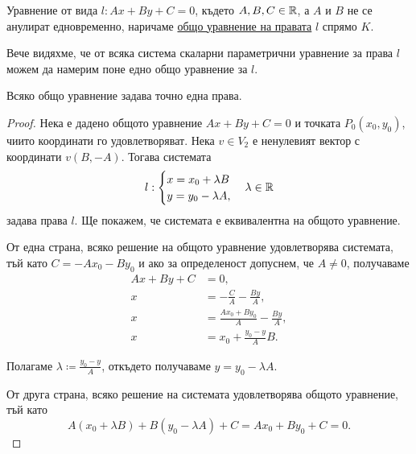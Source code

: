 \documentclass[numbers=endperiod, DIV=15]{scrartcl}
\begin{document}
\begin{definition}
  Уравнение от вида $l: Ax + By + C = 0$, където $A, B, C \in \mathbb{R}$, а $A$ и $B$ не се анулират едновременно, наричаме \underline{общо уравнение на правата} $l$ спрямо $K$.
\end{definition}

Вече видяхме, че от всяка система скаларни параметрични уравнение за права $l$ можем да намерим поне едно общо уравнение за $l$.

\begin{proposition}
  Всяко общо уравнение задава точно една права.
\end{proposition}
\begin{proof}
  Нека е дадено общото уравнение $Ax + By + C = 0$ и точката $P_0(x_0, y_0)$, чиито координати го удовлетворяват. Нека $v \in V_2$ е ненулевият вектор с координати $v(B, -A)$. Тогава системата
  \begin{align*}
    l: \begin{cases}
      x = x_0 + \lambda B \\
      y = y_0 - \lambda A,
    \end{cases}
    \lambda \in \mathbb{R}
  \end{align*}
  задава права $l$. Ще покажем, че системата е еквивалентна на общото уравнение.

  От една страна, всяко решение на общото уравнение удовлетворява системата, тъй като $C = -Ax_0 - By_0$ и ако за определеност допуснем, че $A \neq 0$, получаваме
  \begin{align*}
    Ax + By + C &= 0, \\
    x &= -\frac C A -\frac {By} A, \\
    x &= \frac {Ax_0 + By_0} A -\frac {By} A, \\
    x &= x_0 + \frac {y_0 - y} A B.
  \end{align*}

  Полагаме $\lambda \coloneqq \frac{y_0 - y} A$, откъдето получаваме $y = y_0 - \lambda A$.

  От друга страна, всяко решение на системата удовлетворява общото уравнение, тъй като
  \begin{displaymath}
    A (x_0 + \lambda B) + B (y_0 - \lambda A) + C
    =
    A x_0 + B y_0 + C
    =
    0.
  \end{displaymath}
\end{proof}
\end{document}
